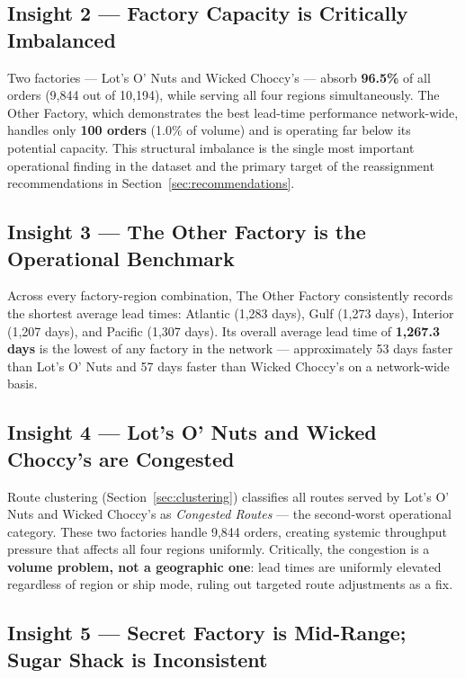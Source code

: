 \documentclass[12pt, a4paper]{article}
\newcommand{\fact}[1]{\textbf{#1}}
\begin{document}
\subsection{Insight 2 --- Factory Capacity is Critically Imbalanced}

Two factories --- Lot's O' Nuts and Wicked Choccy's --- absorb
\textbf{96.5\%} of all orders (9,844 out of 10,194), while
serving all four regions simultaneously.
The Other Factory, which demonstrates the best lead-time performance
network-wide, handles only \textbf{100 orders} (1.0\% of volume)
and is operating far below its potential capacity.
This structural imbalance is the single most important operational
finding in the dataset and the primary target of the
reassignment recommendations in Section~\ref{sec:recommendations}.

\subsection{Insight 3 --- The Other Factory is the Operational Benchmark}

Across every factory-region combination, The Other Factory
consistently records the shortest average lead times:
Atlantic (1,283 days), Gulf (1,273 days), Interior (1,207 days),
and Pacific (1,307 days).
Its overall average lead time of \fact{1,267.3 days} is the lowest
of any factory in the network --- approximately 53 days faster than
Lot's O' Nuts and 57 days faster than Wicked Choccy's on a
network-wide basis.

\subsection{Insight 4 --- Lot's O' Nuts and Wicked Choccy's are Congested}

Route clustering (Section~\ref{sec:clustering}) classifies all
routes served by Lot's O' Nuts and Wicked Choccy's as
\emph{Congested Routes} --- the second-worst operational category.
These two factories handle 9,844 orders, creating systemic
throughput pressure that affects all four regions uniformly.
Critically, the congestion is a \textbf{volume problem, not a
geographic one}: lead times are uniformly elevated regardless
of region or ship mode, ruling out targeted route adjustments
as a fix.

\subsection{Insight 5 --- Secret Factory is Mid-Range; Sugar Shack is Inconsistent}
\end{document}
